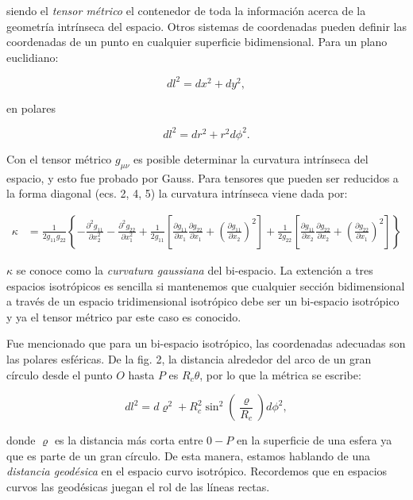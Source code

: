 \documentclass[11pt]{article}
\begin{document}
    siendo el {\textit{tensor métrico}} el contenedor de toda la información acerca de la geometría intrínseca del espacio. Otros sistemas de coordenadas pueden definir las coordenadas de un punto en cualquier superficie bidimensional. Para un plano euclidiano: 

\begin{equation}
    dl^2 = dx^2 +  dy^2,
\end{equation}

en polares

\begin{equation}
    dl^2 = dr^2 + r^2 d\phi^2.
\end{equation}

Con el tensor métrico $g_{\mu \nu}$ es posible determinar la curvatura intrínseca del espacio, y esto fue probado por Gauss. Para tensores que pueden ser reducidos a la forma diagonal (ecs. 2, 4, 5) la curvatura intrínseca viene dada por:


    \begin{align*}
        \kappa & = \frac{1}{2 g_{11} g_{22}} \left\{ - \frac{\partial^2g_{11} }{\partial x_2^2} - \frac{\partial^2g_{22} }{\partial x_1^2} + \frac{1}{2 g_{11}} \left[ \frac{\partial g_{11} }{\partial x_1} \frac{\partial g_{22} }{\partial x_1} +   \left( \frac{\partial g_{11} }{\partial x_2} \right)^2 \right] 
        + \frac{1}{2 g_{22}} \left[ \frac{\partial g_{11} }{\partial x_2} \frac{\partial g_{22} }{\partial x_2} + \left( \frac{\partial g_{22} }{\partial x_1} \right)^2 \right] \right\} 
    \end{align*}

$\kappa$ se conoce como la {\textit{curvatura gaussiana}} del bi-espacio. La extención a tres espacios isotrópicos es sencilla si mantenemos que cualquier sección bidimensional a través de un espacio tridimensional isotrópico debe ser un bi-espacio isotrópico y ya el tensor métrico par este caso es conocido. 

Fue mencionado que para un bi-espacio isotrópico, las coordenadas adecuadas son las polares esféricas. De la fig. 2, la distancia alrededor del arco de un gran círculo desde el punto $O$ hasta $P$ es $R_c \theta$, por lo que la métrica se escribe:

    \begin{equation}
        dl^2 = d\varrho^2 + R_c^2 \sin^2\left(\frac{\varrho}{R_c} \right) d\phi^2,
    \end{equation}

donde $\varrho$ es la distancia más corta entre $0-P$  en la superficie de una esfera ya que es parte de un gran  círculo. De esta manera, estamos hablando de una {\textit{distancia geodésica}} en el espacio curvo isotrópico. Recordemos que en espacios curvos las geodésicas juegan el rol de las líneas rectas.
\end{document}
